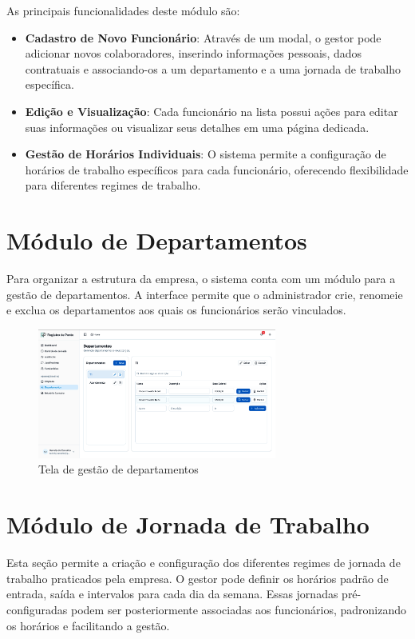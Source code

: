 As principais funcionalidades deste módulo são:

\begin{itemize}
\item \textbf{Cadastro de Novo Funcionário}: Através de um modal, o gestor pode adicionar novos colaboradores, inserindo informações pessoais, dados contratuais e associando-os a um departamento e a uma jornada de trabalho específica.
\item \textbf{Edição e Visualização}: Cada funcionário na lista possui ações para editar suas informações ou visualizar seus detalhes em uma página dedicada.
\item \textbf{Gestão de Horários Individuais}: O sistema permite a configuração de horários de trabalho específicos para cada funcionário, oferecendo flexibilidade para diferentes regimes de trabalho.
\end{itemize}

\section{Módulo de Departamentos}

Para organizar a estrutura da empresa, o sistema conta com um módulo para a gestão de departamentos. A interface permite que o administrador crie, renomeie e exclua os departamentos aos quais os funcionários serão vinculados.

\begin{figure}[H]
\centering
\includegraphics[width=0.7\textwidth]{imagens/gestao-departamentos.png}
\caption{Tela de gestão de departamentos}
\label{fig:gestao-departamentos}
\end{figure}

\section{Módulo de Jornada de Trabalho}

Esta seção permite a criação e configuração dos diferentes regimes de jornada de trabalho praticados pela empresa. O gestor pode definir os horários padrão de entrada, saída e intervalos para cada dia da semana. Essas jornadas pré-configuradas podem ser posteriormente associadas aos funcionários, padronizando os horários e facilitando a gestão.

